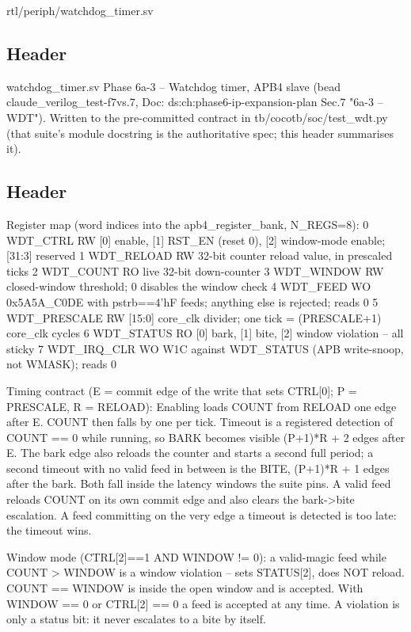 \begin{relocated}{rtl/periph/watchdog_timer.sv}

\subsection*{Header}

\begin{textblock}
watchdog_timer.sv
Phase 6a-3 -- Watchdog timer, APB4 slave (bead claude_verilog_test-f7vs.7,
Doc: ds:ch:phase6-ip-expansion-plan Sec.7 "6a-3 -- WDT"). Written to the pre-committed contract in
tb/cocotb/soc/test_wdt.py (that suite's module docstring is the authoritative spec; this header
summarises it).
\end{textblock}

\subsection*{Header}

\begin{textblock}
Register map (word indices into the apb4_register_bank, N_REGS=8):
  0  WDT_CTRL      RW  [0] enable, [1] RST_EN (reset 0), [2] window-mode enable; [31:3] reserved
  1  WDT_RELOAD    RW  32-bit counter reload value, in prescaled ticks
  2  WDT_COUNT     RO  live 32-bit down-counter
  3  WDT_WINDOW    RW  closed-window threshold; 0 disables the window check
  4  WDT_FEED      WO  0x5A5A_C0DE with pstrb==4'hF feeds; anything else is rejected; reads 0
  5  WDT_PRESCALE  RW  [15:0] core_clk divider; one tick = (PRESCALE+1) core_clk cycles
  6  WDT_STATUS    RO  [0] bark, [1] bite, [2] window violation -- all sticky
  7  WDT_IRQ_CLR   WO  W1C against WDT_STATUS (APB write-snoop, not WMASK); reads 0

Timing contract (E = commit edge of the write that sets CTRL[0]; P = PRESCALE, R = RELOAD):
  Enabling loads COUNT from RELOAD one edge after E. COUNT then falls by one per tick. Timeout
  is a registered detection of COUNT == 0 while running, so BARK becomes visible (P+1)*R + 2
  edges after E. The bark edge also reloads the counter and starts a second full period; a
  second timeout with no valid feed in between is the BITE, (P+1)*R + 1 edges after the bark.
  Both fall inside the latency windows the suite pins.
  A valid feed reloads COUNT on its own commit edge and also clears the bark->bite escalation.
  A feed committing on the very edge a timeout is detected is too late: the timeout wins.

Window mode (CTRL[2]==1 AND WINDOW != 0): a valid-magic feed while COUNT > WINDOW is a window
violation -- sets STATUS[2], does NOT reload. COUNT == WINDOW is inside the open window and is
accepted. With WINDOW == 0 or CTRL[2] == 0 a feed is accepted at any time. A violation is only
a status bit: it never escalates to a bite by itself.


\end{textblock}
\end{relocated}
